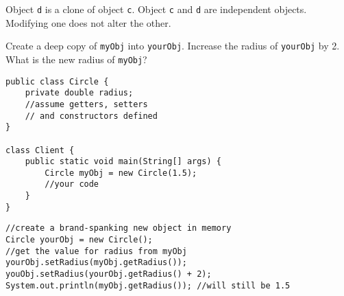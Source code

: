  Object \texttt{d} is a clone of object \texttt{c}. Object \texttt{c} and \texttt{d} are independent objects. Modifying one does not alter the other.

\begin{center}
\bgroup \tikzset{png export}  \egroup
\end{center}

  
\begin{exercise}
Create a deep copy of \texttt{myObj} into \texttt{yourObj}. Increase the radius of \texttt{yourObj} by 2. What is the new radius of \texttt{myObj}?

\begin{lstlisting}[frame=single,style=buggy]
public class Circle {
	private double radius;
	//assume getters, setters
	// and constructors defined
}

class Client {
	public static void main(String[] args) {
		Circle myObj = new Circle(1.5);
		//your code
	}
}
\end{lstlisting}  	
\end{exercise}

\begin{answer} \begin{lstlisting}
//create a brand-spanking new object in memory
Circle yourObj = new Circle(); 
//get the value for radius from myObj
yourObj.setRadius(myObj.getRadius());
youObj.setRadius(yourObj.getRadius() + 2);
System.out.println(myObj.getRadius()); //will still be 1.5
\end{lstlisting} \end{answer}

